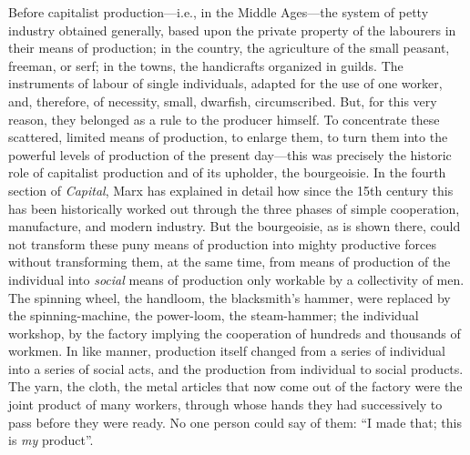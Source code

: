 Before capitalist production---i.e., in the Middle Ages---the system of petty
industry obtained generally, based upon the private property of the labourers in
their means of production; in the country, the agriculture of the small peasant,
freeman, or serf; in the towns, the handicrafts organized in guilds. The
instruments of labour of single individuals, adapted for the use of one worker,
and, therefore, of necessity, small, dwarfish, circumscribed. But, for this very
reason, they belonged as a rule to the producer himself. To concentrate these
scattered, limited means of production, to enlarge them, to turn them into the
powerful levels of production of the present day---this was precisely the
historic role of capitalist production and of its upholder, the bourgeoisie. In
the fourth section of \emph{Capital}, Marx has explained in detail how since the
15th century this has been historically worked out through the three phases of
simple cooperation, manufacture, and modern industry. But the bourgeoisie, as
is shown there, could not transform these puny means of production into mighty
productive forces without transforming them, at the same time, from means of
production of the individual into \emph{social} means of production only
workable by a collectivity of men. The spinning wheel, the handloom, the
blacksmith's hammer, were replaced by the spinning-machine, the power-loom, the
steam-hammer; the individual workshop, by the factory implying the cooperation
of hundreds and thousands of workmen. In like manner, production itself changed
from a series of individual into a series of social acts, and the production
from individual to social products. The yarn, the cloth, the metal articles that
now come out of the factory were the joint product of many workers, through
whose hands they had successively to pass before they were ready. No one person
could say of them: ``I made that; this is \emph{my} product''.

